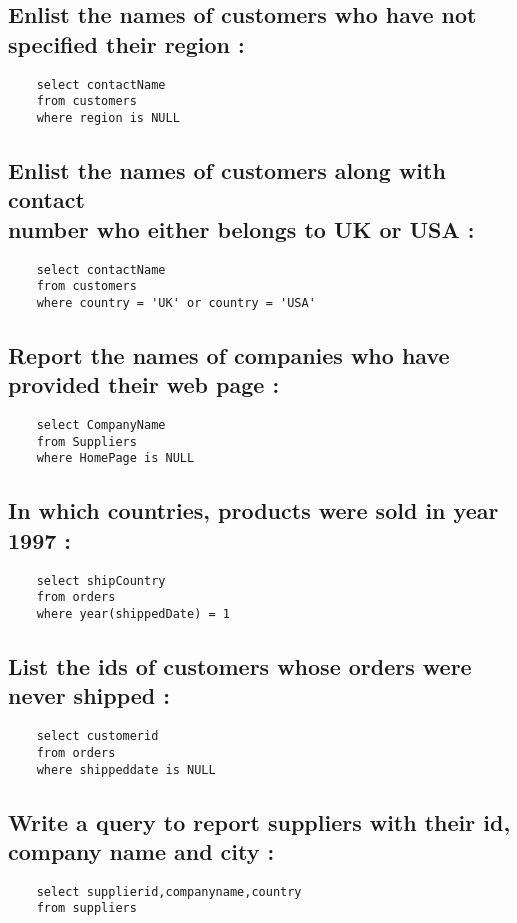 \documentclass{article}
\begin{document}
\subsection{Enlist the names of customers who have not specified their region :}
\begin{lstlisting}
    select contactName
    from customers
    where region is NULL
\end{lstlisting}

\subsection{Enlist the names of customers along with contact \\ number who either belongs to UK or USA :}
\begin{lstlisting}
    select contactName
    from customers
    where country = 'UK' or country = 'USA'
\end{lstlisting}

\subsection{Report the names of companies who have provided their web page :}
\begin{lstlisting}
    select CompanyName
    from Suppliers
    where HomePage is NULL
\end{lstlisting}

\subsection{In which countries, products were sold in year 1997 :}
\begin{lstlisting}
    select shipCountry
    from orders
    where year(shippedDate) = 1
\end{lstlisting}

\subsection{ List the ids of customers whose orders were never shipped :}
\begin{lstlisting}
    select customerid
    from orders
    where shippeddate is NULL
\end{lstlisting}

\subsection{Write a query to report suppliers with their id, company name and city :}
\begin{lstlisting}
    select supplierid,companyname,country
    from suppliers
\end{lstlisting}
\end{document}
